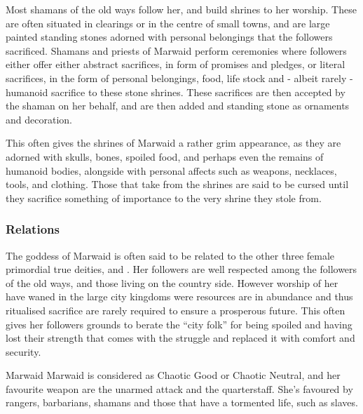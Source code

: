 Most shamans of the old ways follow her, and build shrines to her worship.
These are often situated in clearings or in the centre of small towns, and are
large painted standing stones adorned with personal belongings that the
followers sacrificed. Shamans and priests of Marwaid perform ceremonies where
followers either offer either abstract sacrifices, in form of promises and
pledges, or literal sacrifices, in the form of personal belongings, food, life
stock and - albeit rarely - humanoid sacrifice to these stone shrines. These
sacrifices are then accepted by the shaman on her behalf, and are then added
and standing stone as ornaments and decoration.

This often gives the shrines of Marwaid a rather grim appearance, as they are
adorned with skulls, bones, spoiled food, and perhaps even the remains of
humanoid bodies, alongside with personal affects such as weapons, necklaces,
tools, and clothing. Those that take from the shrines are said to be cursed
until they sacrifice something of importance to the very shrine they stole
from.

\subsubsection{Relations}

The goddess of Marwaid is often said to be related to the other three
female primordial true deities,  and .
Her followers are well respected among the followers of the old ways, and
those living on the country side. However worship of her have waned in the
large city kingdoms were resources are in abundance and thus ritualised
sacrifice are rarely required to ensure a prosperous future. This often gives
her followers grounds to berate the ``city folk'' for being spoiled and having
lost their strength that comes with the struggle and replaced it with comfort
and security.

\begin{35e}{Marwaid}
  Marwaid is considered as Chaotic Good or Chaotic Neutral, and her favourite
  weapon are the unarmed attack and the quarterstaff. She's favoured by rangers,
  barbarians, shamans and those that have a tormented life, such as slaves.
\end{35e}

\clearpage
{}
\clearpage
